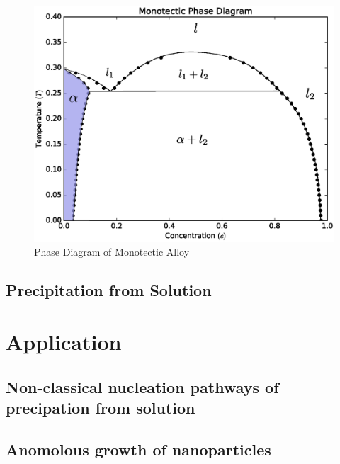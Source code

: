 \documentclass[showkeys, prb, reprint]{revtex4-1}
\begin{document}
\begin{figure}
	\includegraphics[scale=0.4]{monotectic.eps}
	\caption{\label{monotectic} Phase Diagram of Monotectic Alloy}
\end{figure}

\subsection{Precipitation from Solution}


\section{Application}

\subsection{Non-classical nucleation pathways of precipation from solution}

\subsection{Anomolous growth of nanoparticles}
\end{document}
